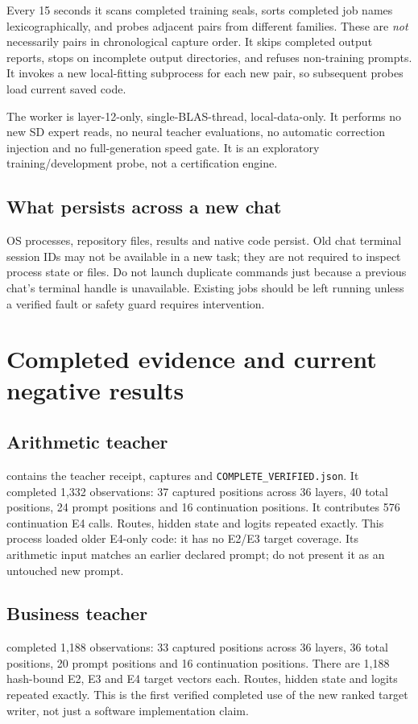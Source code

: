 \documentclass[11pt,a4paper]{article}
\begin{document}
Every 15 seconds it scans completed training seals, sorts completed job names
lexicographically, and probes adjacent pairs from different families. These
are \emph{not} necessarily pairs in chronological capture order. It skips
completed output reports, stops on incomplete output directories, and refuses
non-training prompts. It invokes a new local-fitting subprocess for each new
pair, so subsequent probes load current saved code.

The worker is layer-12-only, single-BLAS-thread, local-data-only. It performs
no new SD expert reads, no neural teacher evaluations, no automatic correction
injection and no full-generation speed gate. It is an exploratory
training/development probe, not a certification engine.

\subsection{What persists across a new chat}
OS processes, repository files, results and native code persist. Old chat
terminal session IDs may not be available in a new task; they are not required
to inspect process state or files. Do not launch duplicate commands just
because a previous chat's terminal handle is unavailable. Existing jobs should
be left running unless a verified fault or safety guard requires intervention.

\section{Completed evidence and current negative results}
\subsection{Arithmetic teacher}
contains the teacher receipt, captures and \texttt{COMPLETE\_VERIFIED.json}.
It completed 1,332 observations: 37 captured positions across 36 layers,
40 total positions, 24 prompt positions and 16 continuation positions.
It contributes 576 continuation E4 calls. Routes, hidden state and logits
repeated exactly. This process loaded older E4-only code: it has no E2/E3
target coverage. Its arithmetic input matches an earlier declared prompt;
do not present it as an untouched new prompt.

\subsection{Business teacher}
completed 1,188 observations: 33 captured positions across 36 layers, 36 total
positions, 20 prompt positions and 16 continuation positions. There are 1,188
hash-bound E2, E3 and E4 target vectors each. Routes, hidden state and logits
repeated exactly. This is the first verified completed use of the new ranked
target writer, not just a software implementation claim.
\end{document}
